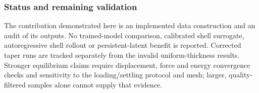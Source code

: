\subsubsection{Status and remaining validation}
The contribution demonstrated here is an implemented data construction and
an audit of its outputs. No trained-model comparison, calibrated shell
surrogate, autoregressive shell rollout or persistent-latent benefit is
reported. Corrected taper runs are tracked separately from the invalid
uniform-thickness results. Stronger equilibrium claims require displacement,
force and energy convergence checks and sensitivity to the loading/settling
protocol and mesh; larger, quality-filtered samples alone cannot supply that
evidence.
